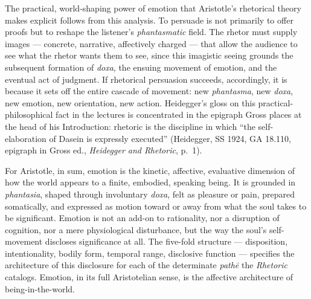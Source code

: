 \documentclass{article}
\begin{document}
The practical, world-shaping power of emotion that Aristotle's rhetorical theory makes explicit follows from this analysis. To persuade is not primarily to offer proofs but to reshape the listener's \textit{phantasmatic} field. The rhetor must supply images --- concrete, narrative, affectively charged --- that allow the audience to see what the rhetor wants them to see, since this imagistic seeing grounds the subsequent formation of \textit{doxa}, the ensuing movement of emotion, and the eventual act of judgment. If rhetorical persuasion succeeds, accordingly, it is because it sets off the entire cascade of movement: new \textit{phantasma}, new \textit{doxa}, new emotion, new orientation, new action. Heidegger's gloss on this practical-philosophical fact in the lectures is concentrated in the epigraph Gross places at the head of his Introduction: rhetoric is the discipline in which ``the self-elaboration of Dasein is expressly executed'' (Heidegger, SS 1924, GA 18.110, epigraph in Gross ed., \textit{Heidegger and Rhetoric}, p.~1).

For Aristotle, in sum, emotion is the kinetic, affective, evaluative dimension of how the world appears to a finite, embodied, speaking being. It is grounded in \textit{phantasia}, shaped through involuntary \textit{doxa}, felt as pleasure or pain, prepared somatically, and expressed as motion toward or away from what the soul takes to be significant. Emotion is not an add-on to rationality, nor a disruption of cognition, nor a mere physiological disturbance, but the way the soul's self-movement discloses significance at all. The five-fold structure --- disposition, intentionality, bodily form, temporal range, disclosive function --- specifies the architecture of this disclosure for each of the determinate \textit{pathē} the \textit{Rhetoric} catalogs. Emotion, in its full Aristotelian sense, is the affective architecture of being-in-the-world.
\end{document}

